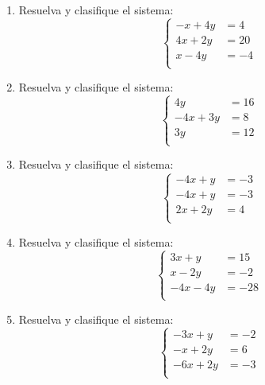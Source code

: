 \documentclass[11pt]{article}
\begin{document}
\begin{enumerate}
\[\begin{aligned}
-4x-3y&=5\\
2x-2y&=8\\
-x+y&=-4\\
\end{aligned}\right.
\]
\item Resuelva y clasifique el sistema:
\[
\left\{\begin{aligned}
-x+4y&=4\\
4x+2y&=20\\
x-4y&=-4\\
\end{aligned}\right.
\]
\item Resuelva y clasifique el sistema:
\[
\left\{\begin{aligned}
4y&=16\\
-4x+3y&=8\\
3y&=12\\
\end{aligned}\right.
\]
\item Resuelva y clasifique el sistema:
\[
\left\{\begin{aligned}
-4x+y&=-3\\
-4x+y&=-3\\
2x+2y&=4\\
\end{aligned}\right.
\]
\item Resuelva y clasifique el sistema:
\[
\left\{\begin{aligned}
3x+y&=15\\
x-2y&=-2\\
-4x-4y&=-28\\
\end{aligned}\right.
\]
\item Resuelva y clasifique el sistema:
\[
\left\{\begin{aligned}
-3x+y&=-2\\
-x+2y&=6\\
-6x+2y&=-3\\
\end{aligned}\right.
\]
\end{enumerate}
\end{document}
